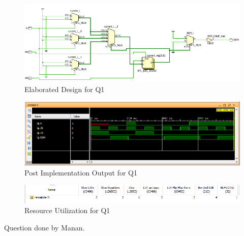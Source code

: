 \documentclass[11pt,a4paper]{article}
\begin{document}
	\begin{figure}[H]
		\centering
		\includegraphics[width=1\linewidth]{images/q1elaborated}
		\caption[]{Elaborated Design for Q1}
		\label{fig:q1elaborated}
	\end{figure}
	
	
	\begin{figure}[H]
		\centering
		\includegraphics[width=1\linewidth]{images/q1output}
		\caption[]{Post Implementation Output for Q1}
		\label{fig:q1output}
	\end{figure}
	\begin{figure}[H]
		\centering
		\includegraphics[width=1\linewidth]{images/q1utilization}
		\caption[]{Resource Utilization for Q1}
		\label{fig:q1utilization}
	\end{figure}
	Question done by Manan.\\
	 
\end{document}
